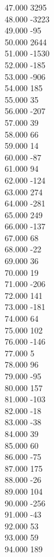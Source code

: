 { 47.000	3295 \\
 48.000	-3223 \\
 49.000	-95 \\
 50.000	2644 \\
 51.000	-1530 \\
 52.000	-185 \\
 53.000	-906 \\
 54.000	185 \\
 55.000	35 \\
 56.000	-207 \\
 57.000	39 \\
 58.000	66 \\
 59.000	14 \\
 60.000	-87 \\
 61.000	94 \\
 62.000	-124 \\
 63.000	274 \\
 64.000	-281 \\
 65.000	249 \\
 66.000	-137 \\
 67.000	68 \\
 68.000	-22 \\
 69.000	36 \\
 70.000	19 \\
 71.000	-206 \\
 72.000	141 \\
 73.000	-181 \\
 74.000	64 \\
 75.000	102 \\
 76.000	-146 \\
 77.000	5 \\
 78.000	96 \\
 79.000	-95 \\
 80.000	157 \\
 81.000	-103 \\
 82.000	-18 \\
 83.000	-38 \\
 84.000	39 \\
 85.000	60 \\
 86.000	-75 \\
 87.000	175 \\
 88.000	-26 \\
 89.000	104 \\
 90.000	-256 \\
 91.000	-43 \\
 92.000	53 \\
 93.000	59 \\
 94.000	189 \\
}
